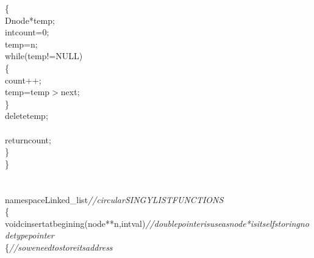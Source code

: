 \documentclass[a4paper, 9pt]{article}
\newcommand\SPC{\hspace*{0.6em}}
\newcommand\TAB{\hspace*{1.2em}}
\newcommand\HYP{\mbox{\char 45}}
\newcommand{\CppAComment}[1]{\textit{\textcolor[rgb]{0.4,0.45,0.48}{#1}}}
\newcommand{\CppAIdentifier}[1]{\textcolor[rgb]{0.88,0.89,0.89}{#1}}
\newcommand{\CppANumber}[1]{\textcolor[rgb]{1,0.8,0.13}{#1}}
\newcommand{\CppAReservedWord}[1]{\textcolor[rgb]{0.4,0.55,0.69}{#1}}
\newcommand{\CppASpace}[1]{\colorbox[rgb]{0.16,0.19,0.2}{#1}}
\newcommand{\CppASymbol}[1]{\textcolor[rgb]{0.91,0.89,0.72}{#1}}
\begin{document}
\begin{ttfamily}
\CppASpace{\TAB }\CppASymbol{\{}\\
\CppASpace{\TAB \TAB }\CppAIdentifier{Dnode}\CppASpace{\SPC }\CppASymbol{*}\CppAIdentifier{temp}\CppASymbol{;}\\
\CppASpace{\TAB \TAB }\CppAReservedWord{int}\CppASpace{\SPC }\CppAIdentifier{count}\CppASpace{\SPC }\CppASymbol{=}\CppASpace{\SPC }\CppANumber{0}\CppASymbol{;}\\
\CppASpace{\TAB \TAB }\CppAIdentifier{temp}\CppASpace{\SPC }\CppASymbol{=}\CppASpace{\SPC }\CppAIdentifier{n}\CppASymbol{;}\\
\CppASpace{\TAB \TAB }\CppAReservedWord{while}\CppASymbol{(}\CppAIdentifier{temp}\CppASymbol{!=}\CppAIdentifier{NULL}\CppASymbol{)}\\
\CppASpace{\TAB \TAB }\CppASymbol{\{}\\
\CppASpace{\TAB \TAB \TAB }\CppAIdentifier{count}\CppASymbol{++}\CppASymbol{;}\\
\CppASpace{\TAB \TAB \TAB }\CppAIdentifier{temp}\CppASpace{\SPC }\CppASymbol{=}\CppASpace{\SPC }\CppAIdentifier{temp}\CppASymbol{\HYP $>$}\CppAIdentifier{next}\CppASymbol{;}\\
\CppASpace{\TAB \TAB }\CppASymbol{\}}\\
\CppASpace{\TAB \TAB }\CppAReservedWord{delete}\CppASpace{\SPC }\CppAIdentifier{temp}\CppASymbol{;}\\
\CppASpace{\TAB \TAB }\\
\CppASpace{\TAB \TAB }\CppAReservedWord{return}\CppASpace{\SPC }\CppAIdentifier{count}\CppASymbol{;}\\
\CppASpace{\TAB }\CppASymbol{\}}\\
\CppASymbol{\}}\\
\\
\\
\CppAReservedWord{namespace}\CppASpace{\SPC }\CppAIdentifier{Linked\_list}\CppASpace{\SPC \SPC }\CppAComment{//circularSINGYLISTFUNCTIONS}\\
\CppASymbol{\{}\\
\CppASpace{\TAB }\CppAReservedWord{void}\CppASpace{\SPC \SPC }\CppAIdentifier{cinsertatbegining}\CppASymbol{(}\CppASpace{\SPC }\CppAIdentifier{node}\CppASymbol{*}\CppASymbol{*}\CppASpace{\SPC }\CppAIdentifier{n}\CppASymbol{,}\CppAReservedWord{int}\CppASpace{\SPC }\CppAIdentifier{val}\CppASymbol{)}\CppAComment{//double\SPC pointer\SPC is\SPC use\SPC as\SPC node\SPC *\SPC is\SPC itself\SPC storing\SPC node\SPC type\SPC pointer\SPC }\\
\CppASpace{\TAB }\CppASymbol{\{}\CppASpace{\SPC \SPC \SPC \SPC \SPC \SPC \SPC \SPC \SPC \SPC \SPC \SPC \SPC \SPC \SPC \SPC \SPC \SPC \SPC \SPC \SPC \SPC \SPC \SPC \SPC \SPC \SPC \SPC }\CppAComment{//\SPC so\SPC we\SPC need\SPC to\SPC store\SPC its\SPC address}\\

\end{ttfamily}
\end{document}
